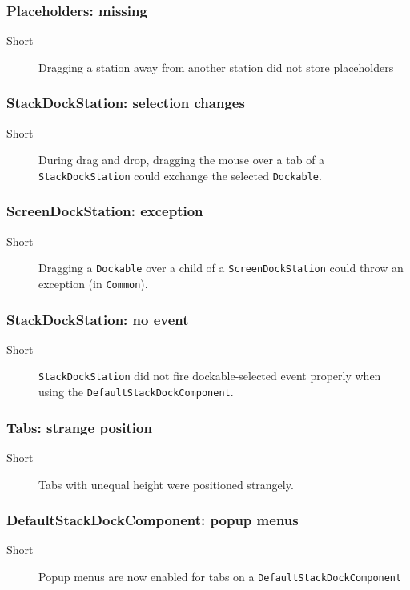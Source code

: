 \documentclass[a4paper,10pt]{article}
\newcommand{\src}[1]{\lstinline[basicstyle=\normalsize\ttfamily,keywordstyle=\normalsize\ttfamily,identifierstyle=\normalsize\ttfamily]|#1|}
\newcommand{\short}{\item[Short]}
\begin{document}
\subsubsection{Placeholders: missing}
\begin{description}
 \short Dragging a station away from another station did not store placeholders
\end{description}

\subsubsection{StackDockStation: selection changes}
\begin{description}
 \short During drag and drop, dragging the mouse over a tab of a \linebreak \src{StackDockStation} could exchange the selected \src{Dockable}.
\end{description}

\subsubsection{ScreenDockStation: exception}
\begin{description}
 \short Dragging a \src{Dockable} over a child of a \src{ScreenDockStation} could throw an exception (in \src{Common}).
\end{description}


\subsubsection{StackDockStation: no event}
\begin{description}
 \short \src{StackDockStation} did not fire dockable-selected event properly when using the \src{DefaultStackDockComponent}.
\end{description}

\subsubsection{Tabs: strange position}
\begin{description}
 \short Tabs with unequal height were positioned strangely.
\end{description}

\subsubsection{DefaultStackDockComponent: popup menus}
\begin{description}
 \short Popup menus are now enabled for tabs on a \linebreak \src{DefaultStackDockComponent}
\end{description}
\end{document}
